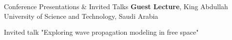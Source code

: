 \begin{rubric}{Conference Presentations \& Invited Talks}
    \entry*[2024/05] \textbf{Guest Lecture}, King Abdullah University of Science and Technology, Saudi Arabia
    \par Invited talk "Exploring wave propagation modeling in free space"
\end{rubric}